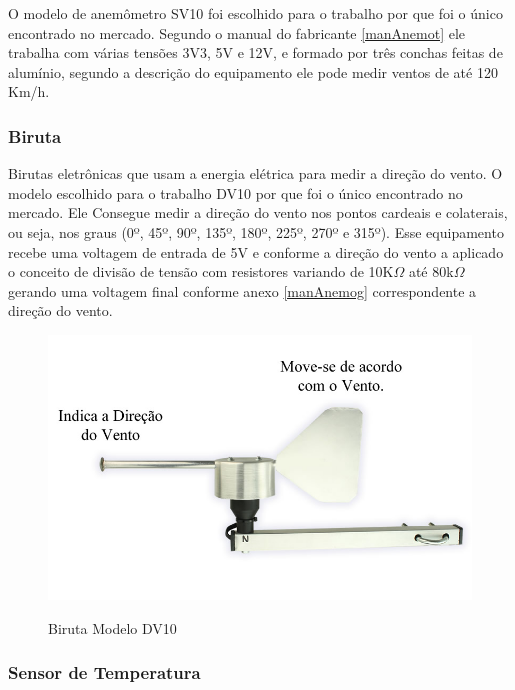O modelo de anemômetro SV10 foi escolhido para o trabalho por que foi o único encontrado no mercado. Segundo o manual do fabricante \ref{manAnemot} ele trabalha com várias tensões 3V3, 5V e 12V, e formado por três conchas feitas de alumínio, segundo a descrição do equipamento ele pode medir ventos de até 120 Km/h\cite{USINAINFOBLOG}.



\subsubsection{Biruta}

Birutas eletrônicas que usam a energia elétrica para medir a direção do vento. O modelo escolhido para o trabalho DV10 por que foi o único encontrado no mercado. Ele Consegue medir a direção do vento nos pontos cardeais e colaterais, ou seja, nos graus (0º, 45º, 90º, 135º, 180º, 225º, 270º e 315º). Esse equipamento recebe uma voltagem de entrada de 5V e conforme a direção do vento a aplicado o conceito de divisão de tensão com resistores variando de 10K$\Omega$ até 80k$\Omega$ gerando uma voltagem final conforme anexo \ref{manAnemog} correspondente a direção do vento.

\begin{figure} [!h]
    \centering
    \caption{Biruta Modelo DV10}
    \includegraphics[scale=0.25]{Figuras/posicao-da-pa-e-indicacao.jpg}
    \label{fig:biruta}
\end{figure}


\subsubsection{Sensor de Temperatura}

